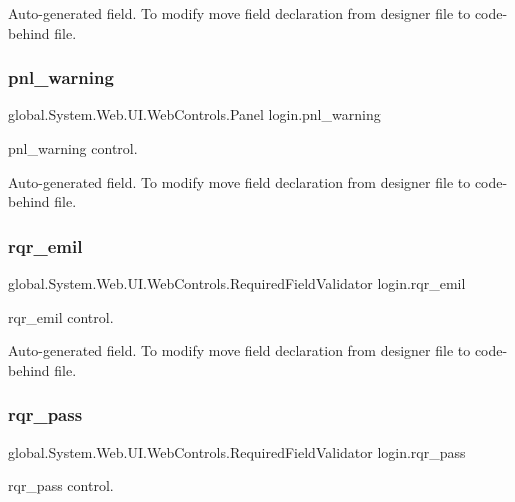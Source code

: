 Auto-\/generated field. To modify move field declaration from designer file to code-\/behind file. \mbox{\label{classlogin_aef0b43d68bab415af6ebfa69075ae14f}} 
\subsubsection{\texorpdfstring{pnl\_warning}{pnl\_warning}}
{\footnotesize\ttfamily global.\+System.\+Web.\+U\+I.\+Web\+Controls.\+Panel login.\+pnl\+\_\+warning\hspace{0.3cm}{\ttfamily [protected]}}



pnl\+\_\+warning control. 

Auto-\/generated field. To modify move field declaration from designer file to code-\/behind file. \mbox{\label{classlogin_aae43e92283a9b1227d8359a04de1dccb}} 
\subsubsection{\texorpdfstring{rqr\_emil}{rqr\_emil}}
{\footnotesize\ttfamily global.\+System.\+Web.\+U\+I.\+Web\+Controls.\+Required\+Field\+Validator login.\+rqr\+\_\+emil\hspace{0.3cm}{\ttfamily [protected]}}



rqr\+\_\+emil control. 

Auto-\/generated field. To modify move field declaration from designer file to code-\/behind file. \mbox{\label{classlogin_ab063bafd472475a635a1f8df22f79955}} 
\subsubsection{\texorpdfstring{rqr\_pass}{rqr\_pass}}
{\footnotesize\ttfamily global.\+System.\+Web.\+U\+I.\+Web\+Controls.\+Required\+Field\+Validator login.\+rqr\+\_\+pass\hspace{0.3cm}{\ttfamily [protected]}}



rqr\+\_\+pass control. 

